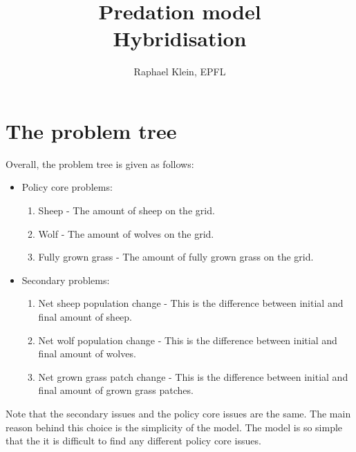 \documentclass[12pt]{article}
\title{Predation model \\ Hybridisation}
\author{Raphael Klein, EPFL}
\begin{document}
\maketitle


\section{The problem tree}
\label{sec:interfaceProblemTree}

Overall, the problem tree is given as follows:

\begin{itemize}
\item Policy core problems:
	\begin{enumerate}
	
	\item Sheep - 
	The amount of sheep on the grid.
	
	\item Wolf - 
	The amount of wolves on the grid.
	
	\item Fully grown grass - 
	The amount of fully grown grass on the grid.
	
	\end{enumerate}
	
\item Secondary problems:
	\begin{enumerate}

	\item Net sheep population change - 
	This is the difference between initial and final amount of sheep.
	
	\item Net wolf population change - 
	This is the difference between initial and final amount of wolves.
	
	\item Net grown grass patch change - 
	This is the difference between initial and final amount of grown grass patches.
	
	\end{enumerate}
	
\end{itemize}

Note that the secondary issues and the policy core issues are the same. The main reason behind this choice is the simplicity of the model. The model is so simple that the it is difficult to find any different policy core issues.
\end{document}
